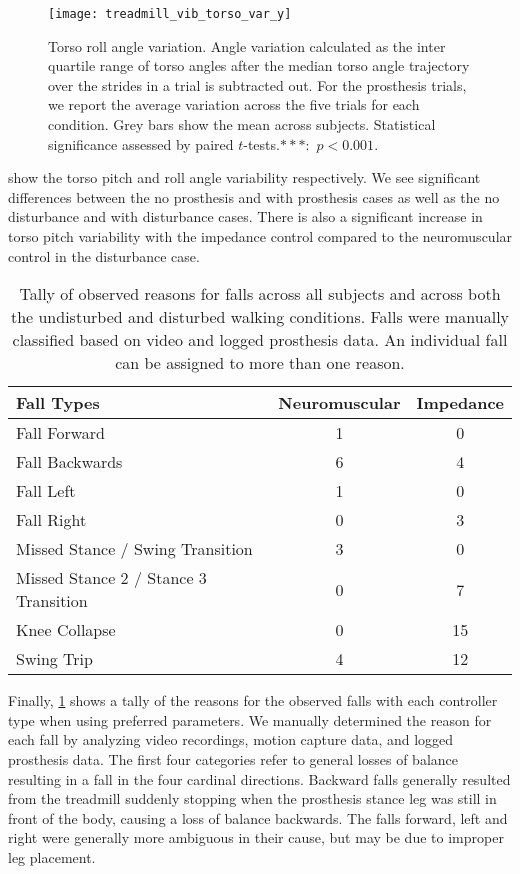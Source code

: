 \begin{figure}[t]
    \centering 
    \texttt{[image: treadmill\_vib\_torso\_var\_y]}
    \caption[Torso roll angle variation]{Torso roll angle variation. Angle
    variation calculated as the inter quartile range of torso angles after the
    median torso angle trajectory over the strides in a trial is subtracted out.
    For the prosthesis trials, we report the average variation across the five
    trials for each condition.  Grey bars show the mean across subjects.
    Statistical significance assessed by paired $t$-tests.$***$:~$p <
    0.001$.}\label{fig:treadmill_exp_torso_var_y}
\end{figure}

 show the
torso pitch and roll angle variability respectively. We see significant
differences between the no prosthesis and with prosthesis cases as well as the
no disturbance and with disturbance cases. There is also a significant increase
in torso pitch variability with the impedance control compared to the
neuromuscular control in the disturbance case.

\begin{table}[t]
  \begin{center}
    \begin{tabular}{lcc}
      Fall Types & Neuromuscular & Impedance \\
      \midrule
      Fall Forward &  1 &  0 \\
      Fall Backwards &  6 &  4 \\
      Fall Left &  1 &  0 \\
      Fall Right &  0 &  3 \\
      Missed Stance / Swing Transition &  3 &  0 \\
      Missed Stance 2 / Stance 3 Transition &  0 &  7 \\
      Knee Collapse & 0 & 15 \\
      Swing Trip & 4 & 12 \\
    \end{tabular}
  \end{center}
  \caption[Tally of observed reasons for falls]{Tally of observed reasons for
  falls across all subjects and across both the undisturbed and disturbed
  walking conditions. Falls were manually classified based on video and logged
  prosthesis data. An individual fall can be assigned to more than one
  reason.}\label{tab:treadmill_exp_fall_reasons}
\end{table}
Finally, \cref{tab:treadmill_exp_fall_reasons} shows a tally of the reasons for
the observed falls with each controller type when using preferred parameters.
We manually determined the reason for each fall by analyzing video recordings,
motion capture data, and logged prosthesis data. The first four categories refer
to general losses of balance resulting in a fall in the four cardinal
directions. Backward falls generally resulted from the treadmill suddenly
stopping when the prosthesis stance leg was still in front of the body, causing
a loss of balance backwards. The falls forward, left and right were generally
more ambiguous in their cause, but may be due to improper leg placement. 

